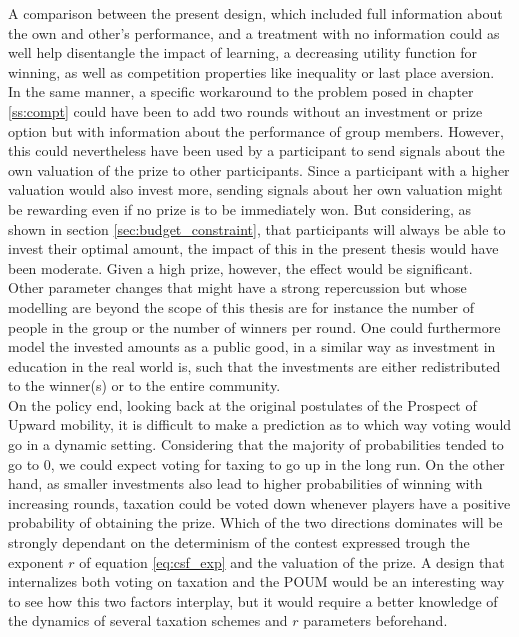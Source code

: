 A comparison between the present design, which included full information about the own and other's performance, and a treatment with no information could as well help disentangle the impact of learning, a decreasing utility function for winning, as well as competition properties like inequality or last place aversion.\\

In the same manner, a specific workaround to the problem posed in chapter \ref{ss:compt} could have been to add two rounds without an investment or prize option but with information about the performance of group members. However, this could nevertheless have been used by a participant to send signals about the own valuation of the prize to other participants. Since a participant with a higher valuation would also invest more, sending signals about her own valuation might be rewarding even if no prize is to be immediately won. But considering, as shown in section \ref{sec:budget_constraint}, that participants will always be able to invest their optimal amount, the impact of this in the present thesis would have been moderate. Given a high prize, however, the effect would be significant.\\

Other parameter changes that might have a strong repercussion but whose modelling are beyond the scope of this thesis are for instance the number of people in the group or the number of winners per round. One could furthermore model the invested amounts as a public good, in a similar way as investment in education in the real world is, such that the investments are either redistributed to the winner(s) or to the entire community.\\

On the policy end, looking back at the original postulates of the Prospect of Upward mobility, it is difficult to make a prediction as to which way voting would go in a dynamic setting. Considering that the majority of probabilities tended to go to 0, we could expect voting for taxing to go up in the long run. On the other hand, as smaller investments also lead to higher probabilities of winning with increasing rounds, taxation could be voted down whenever players have a positive probability of obtaining the prize. Which of the two directions dominates will be strongly dependant on the determinism of the contest expressed trough the exponent $r$ of equation \ref{eq:csf_exp} and the valuation of the prize. A design that internalizes both voting on taxation and the POUM would be an interesting way to see how this two factors interplay, but it would require a better knowledge of the dynamics of several taxation schemes and $r$ parameters beforehand.\\

